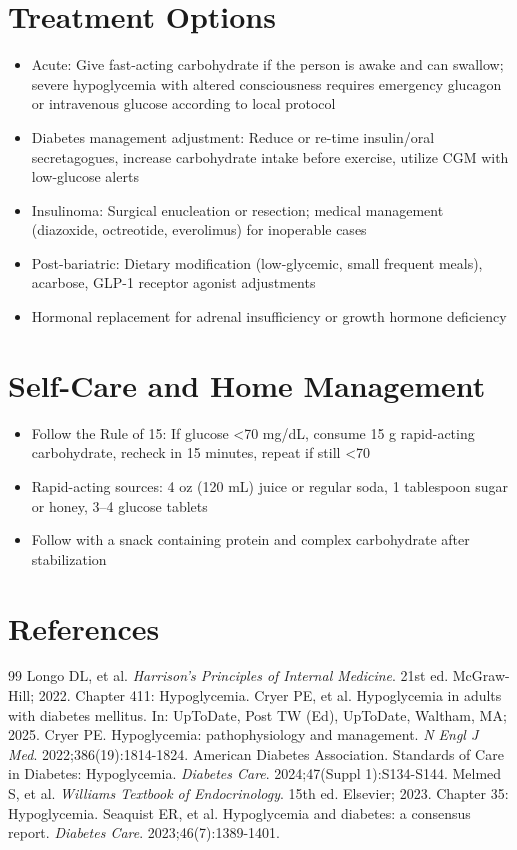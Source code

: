 \section*{Treatment Options}
\begin{itemize}
  \item Acute: Give fast-acting carbohydrate if the person is awake and can swallow; severe hypoglycemia with altered consciousness requires emergency glucagon or intravenous glucose according to local protocol
  \item Diabetes management adjustment: Reduce or re-time insulin/oral secretagogues, increase carbohydrate intake before exercise, utilize CGM with low-glucose alerts
  \item Insulinoma: Surgical enucleation or resection; medical management (diazoxide, octreotide, everolimus) for inoperable cases
  \item Post-bariatric: Dietary modification (low-glycemic, small frequent meals), acarbose, GLP-1 receptor agonist adjustments
  \item Hormonal replacement for adrenal insufficiency or growth hormone deficiency
\end{itemize}

\section*{Self-Care and Home Management}
\begin{itemize}
  \item Follow the Rule of 15: If glucose <70 mg/dL, consume 15 g rapid-acting carbohydrate, recheck in 15 minutes, repeat if still <70
  \item Rapid-acting sources: 4 oz (120 mL) juice or regular soda, 1 tablespoon sugar or honey, 3--4 glucose tablets
  \item Follow with a snack containing protein and complex carbohydrate after stabilization
\end{itemize}

\section*{References}

\begin{thebibliography}{99}
 Longo DL, et al. \emph{Harrison's Principles of Internal Medicine}. 21st ed. McGraw-Hill; 2022. Chapter 411: Hypoglycemia.
 Cryer PE, et al. Hypoglycemia in adults with diabetes mellitus. In: UpToDate, Post TW (Ed), UpToDate, Waltham, MA; 2025.
 Cryer PE. Hypoglycemia: pathophysiology and management. \emph{N Engl J Med}. 2022;386(19):1814-1824.
 American Diabetes Association. Standards of Care in Diabetes: Hypoglycemia. \emph{Diabetes Care}. 2024;47(Suppl 1):S134-S144.
 Melmed S, et al. \emph{Williams Textbook of Endocrinology}. 15th ed. Elsevier; 2023. Chapter 35: Hypoglycemia.
 Seaquist ER, et al. Hypoglycemia and diabetes: a consensus report. \emph{Diabetes Care}. 2023;46(7):1389-1401.
\end{thebibliography}
